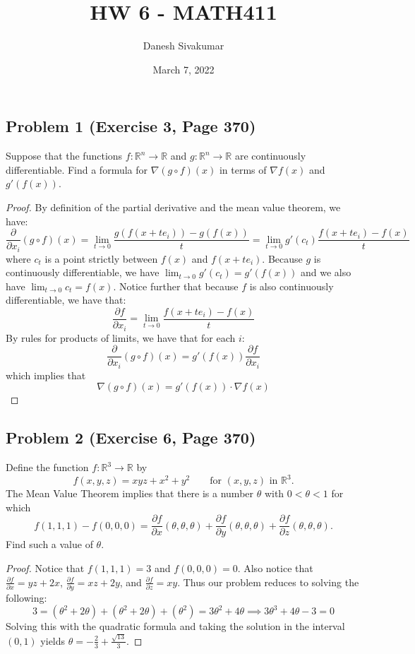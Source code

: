 \documentclass{article}
\title{HW 6 - MATH411}
\author{Danesh Sivakumar}
\date{March 7, 2022}
\begin{document}
\maketitle 


\subsection*{Problem 1 (Exercise 3, Page 370)}
Suppose that the functions $f \colon \mathbb{R}^n \to \mathbb{R}$ and $g \colon \mathbb{R}^n \to \mathbb{R}$ are continuously differentiable. Find a formula for $\nabla (g \circ f)(x)$ in terms of $\nabla f(x)$ and $g'(f(x))$.
\begin{proof} 
By definition of the partial derivative and the mean value theorem, we have:
\[ \frac{\partial}{\partial x_i} (g \circ f) (x) = \lim_{t \to 0}\frac{g(f(x + te_i)) - g(f(x))}{t} = \lim_{t \to 0}g'(c_t) \frac{f(x+te_i) - f(x)}{t}\]
where $c_t$ is a point strictly between $f(x)$ and $f(x+te_i)$. Because $g$ is continuously differentiable, we have $\lim_{t \to 0}g'(c_t) = g'(f(x))$ and we also have $\lim_{t \to 0}c_t = f(x)$. Notice further that because $f$ is also continuously differentiable, we have that: 
\[ \frac{\partial f}{\partial x_i} = \lim_{t \to 0} \frac{f(x+te_i) - f(x)}{t}\]
By rules for products of limits, we have that for each $i$:
\[ \frac{\partial}{\partial x_i} (g \circ f) (x) = g'(f(x)) \frac{\partial f}{\partial x_i}\]
which implies that 
\[ \nabla (g \circ f)(x) = g'(f(x)) \cdot \nabla f(x)\]
\end{proof}

\subsection*{Problem 2 (Exercise 6, Page 370)}
Define the function $f \colon \mathbb{R}^3 \to \mathbb{R}$ by 
\[ f(x, y, z) = xyz + x^2 + y^2 \qquad \text{for } (x, y, z) \text{ in } \mathbb{R}^3.\]
The Mean Value Theorem implies that there is a number $\theta$ with $0 < \theta < 1$ for which
\[ f(1, 1, 1) - f(0, 0, 0) = \frac{\partial f}{\partial x}(\theta, \theta, \theta) + \frac{\partial f}{\partial y}(\theta, \theta, \theta) + \frac{\partial f}{\partial z}(\theta, \theta, \theta).\]
Find such a value of $\theta$.
\begin{proof} 
Notice that $f(1, 1, 1) = 3$ and $f(0, 0, 0) = 0$. Also notice that $\frac{\partial f}{\partial x} = yz + 2x$, $\frac{\partial f}{\partial y} = xz + 2y$, and $\frac{\partial f}{\partial z} = xy$. Thus our problem reduces to solving the following:
\[ 3 = (\theta^2 + 2\theta) + (\theta^2 + 2\theta) + (\theta^2) = 3\theta^2 + 4\theta \implies 3 \theta^3 + 4\theta - 3 = 0\]
Solving this with the quadratic formula and taking the solution in the interval $(0, 1)$ yields $\theta = -\frac{2}{3} + \frac{\sqrt{13}}{3}$.
\end{proof}
\end{document}

